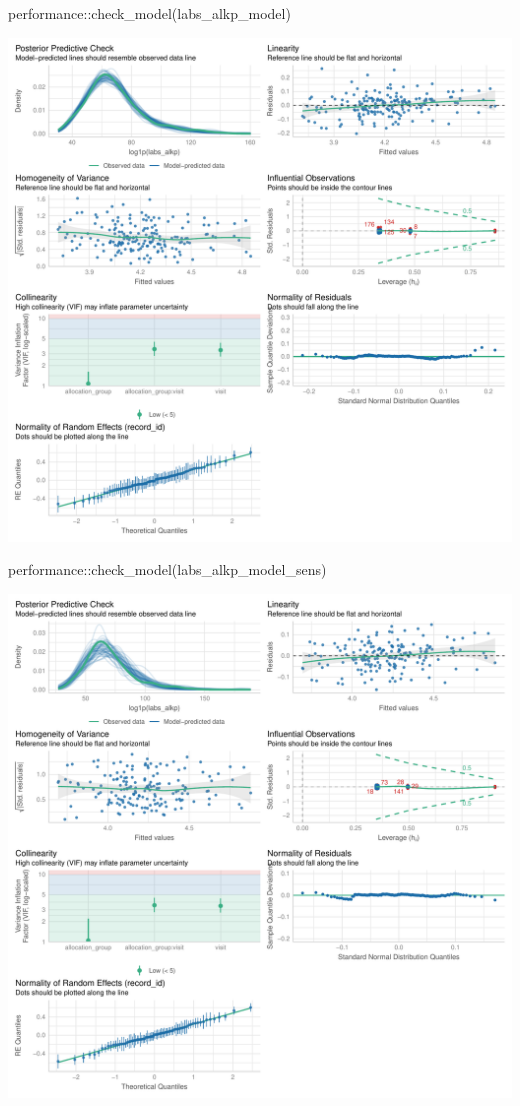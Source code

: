 \documentclass[
  letterpaper,
  DIV=11,
  numbers=noendperiod]{scrartcl}
\newenvironment{Shaded}{\begin{snugshade}}{\end{snugshade}}
\newcommand{\FunctionTok}[1]{\textcolor[rgb]{0.28,0.35,0.67}{#1}}
\newcommand{\NormalTok}[1]{\textcolor[rgb]{0.00,0.23,0.31}{#1}}
\newcommand{\SpecialCharTok}[1]{\textcolor[rgb]{0.37,0.37,0.37}{#1}}
\begin{document}
\begin{Shaded}
\begin{Highlighting}[]
\NormalTok{performance}\SpecialCharTok{::}\FunctionTok{check\_model}\NormalTok{(labs\_alkp\_model)}
\end{Highlighting}
\end{Shaded}

\includegraphics{Outcomes_V1V2V3_files/figure-pdf/labs_alkp_4-1.pdf}

\begin{Shaded}
\begin{Highlighting}[]
\NormalTok{performance}\SpecialCharTok{::}\FunctionTok{check\_model}\NormalTok{(labs\_alkp\_model\_sens)}
\end{Highlighting}
\end{Shaded}

\includegraphics{Outcomes_V1V2V3_files/figure-pdf/labs_alkp_4-2.pdf}
\end{document}

